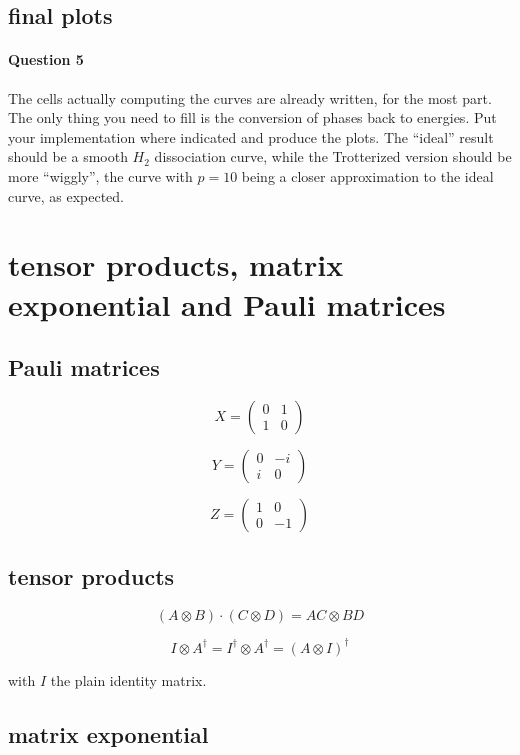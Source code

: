 \documentclass{article}
\begin{document}
\subsection{final plots}

\paragraph{Question 5} The cells actually computing the curves are already written, for the most part. The only
thing you need to fill is the conversion of phases back to energies. Put your implementation where indicated and produce the plots.
The ``ideal'' result should be a smooth $H_{2}$ dissociation curve, while the Trotterized version should be more ``wiggly'',
the curve with $p=10$ being a closer approximation to the ideal curve, as expected.

\appendix
\section{tensor products, matrix exponential and Pauli matrices}

\subsection{Pauli matrices}

$$ X = \begin{pmatrix} 0 & 1 \\ 1 & 0 \end{pmatrix} $$

$$ Y = \begin{pmatrix} 0 & -i \\ i & 0 \end{pmatrix} $$

$$ Z = \begin{pmatrix} 1 & 0 \\ 0 & -1 \end{pmatrix} $$

\subsection{tensor products}

$$ (A\otimes B)\cdot (C\otimes D) = AC\otimes BD $$

$$ I\otimes A^{\dagger} = I^{\dagger}\otimes A^{\dagger} = 
(A\otimes I)^{\dagger}   $$

with $I$ the plain identity matrix.
\subsection{matrix exponential}
\end{document}
